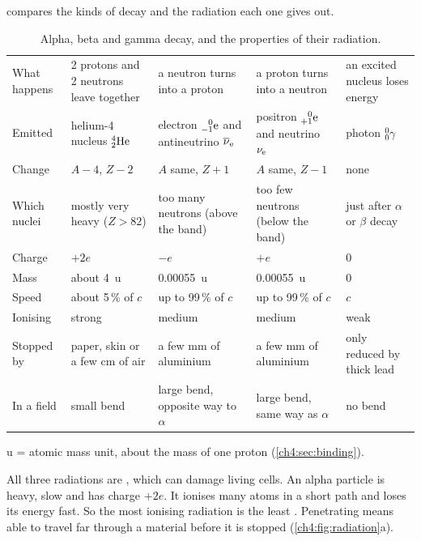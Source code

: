  compares the kinds of decay and the radiation each one gives out.
\begin{table}
  \caption{Alpha, beta and gamma decay, and the properties of their radiation.}\label{ch4:tab:decays}
  \centering\small
  \begin{tabular}{@{}L{20mm}L{28mm}L{28mm}L{28mm}L{26mm}@{}}
    \toprule
    &  & 
      &  & \\
    \midrule
    What happens & 2 protons and 2 neutrons leave together & a neutron turns into a proton
      & a proton turns into a neutron & an excited nucleus loses energy\\
    Emitted & helium-4 nucleus $\chFourAlpha$ & electron $\chFourBeta$ and antineutrino $\overline{\nu}_\mathrm{e}$
      & positron $\chFourPos$ and neutrino $\nu_\mathrm{e}$ & photon ${}^{0}_{0}\gamma$\\
    Change & $A - 4$, $Z - 2$ & $A$ same, $Z + 1$ & $A$ same, $Z - 1$ & none\\
    Which nuclei & mostly very heavy ($Z > 82$) & too many neutrons (above the band)
      & too few neutrons (below the band) & just after $\alpha$ or $\beta$ decay\\
    \midrule
    Charge & $+2e$ & $-e$ & $+e$ & 0\\
    Mass & about \qty{4}{\amu} & \qty{0.00055}{\amu} & \qty{0.00055}{\amu} & 0\\
    Speed & about 5\,\% of $c$ & up to 99\,\% of $c$ & up to 99\,\% of $c$ & $c$\\
    Ionising & strong & medium & medium & weak\\
    Stopped by & paper, skin or a few cm of air & a few mm of aluminium
      & a few mm of aluminium & only reduced by thick lead\\
    In a field & small bend & large bend, opposite way to $\alpha$
      & large bend, same way as $\alpha$ & no bend\\
    \bottomrule
  \end{tabular}\par\smallskip
  {\footnotesize u = atomic mass unit, about the mass of one proton (\cref{ch4:sec:binding}).}
\end{table}

All three radiations are , which can damage living cells. An
alpha particle is heavy, slow and has charge $+2e$. It ionises many atoms in a short
path and loses its energy fast. So the most ionising radiation is the least
. Penetrating means able to travel far through a material before
it is stopped (\cref{ch4:fig:radiation}a).


